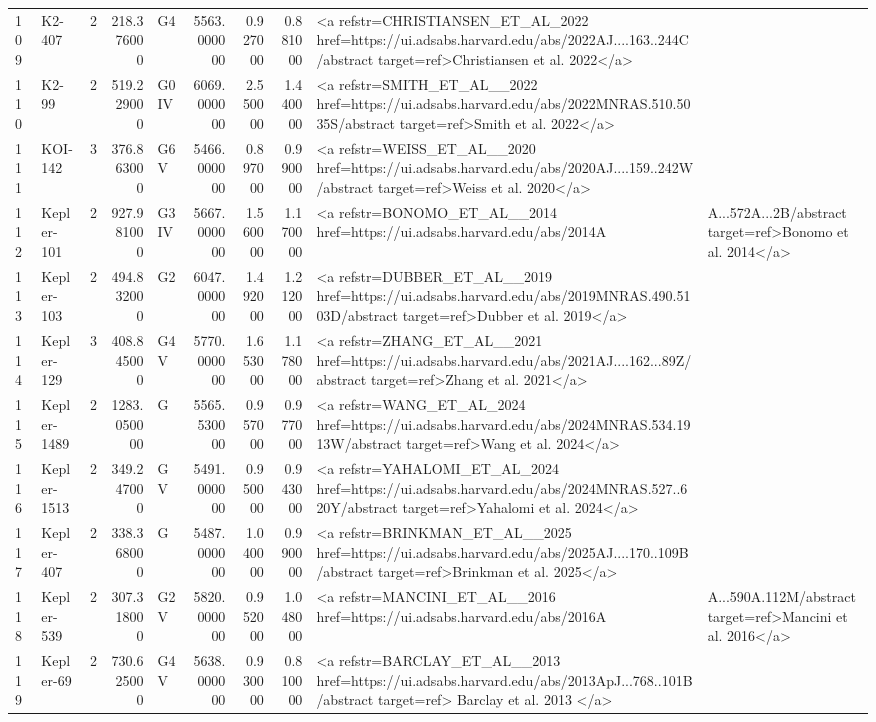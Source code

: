 \begin{tabular}{llrrlrrrl}
109 & K2-407 & 2 & 218.376000 & G4 & 5563.000000 & 0.927000 & 0.881000 & <a refstr=CHRISTIANSEN_ET_AL_2022 href=https://ui.adsabs.harvard.edu/abs/2022AJ....163..244C/abstract target=ref>Christiansen et al. 2022</a> \\
110 & K2-99 & 2 & 519.229000 & G0 IV & 6069.000000 & 2.550000 & 1.440000 & <a refstr=SMITH_ET_AL__2022 href=https://ui.adsabs.harvard.edu/abs/2022MNRAS.510.5035S/abstract target=ref>Smith et al. 2022</a> \\
111 & KOI-142 & 3 & 376.863000 & G6 V & 5466.000000 & 0.897000 & 0.990000 & <a refstr=WEISS_ET_AL__2020 href=https://ui.adsabs.harvard.edu/abs/2020AJ....159..242W/abstract target=ref>Weiss et al. 2020</a> \\
112 & Kepler-101 & 2 & 927.981000 & G3 IV & 5667.000000 & 1.560000 & 1.170000 & <a refstr=BONOMO_ET_AL__2014 href=https://ui.adsabs.harvard.edu/abs/2014A&A...572A...2B/abstract target=ref>Bonomo et al. 2014</a> \\
113 & Kepler-103 & 2 & 494.832000 & G2 & 6047.000000 & 1.492000 & 1.212000 & <a refstr=DUBBER_ET_AL__2019 href=https://ui.adsabs.harvard.edu/abs/2019MNRAS.490.5103D/abstract target=ref>Dubber et al. 2019</a> \\
114 & Kepler-129 & 3 & 408.845000 & G4 V & 5770.000000 & 1.653000 & 1.178000 & <a refstr=ZHANG_ET_AL__2021 href=https://ui.adsabs.harvard.edu/abs/2021AJ....162...89Z/abstract target=ref>Zhang et al. 2021</a> \\
115 & Kepler-1489 & 2 & 1283.050000 & G & 5565.530000 & 0.957000 & 0.977000 & <a refstr=WANG_ET_AL_2024 href=https://ui.adsabs.harvard.edu/abs/2024MNRAS.534.1913W/abstract target=ref>Wang et al. 2024</a> \\
116 & Kepler-1513 & 2 & 349.247000 & G V & 5491.000000 & 0.950000 & 0.943000 & <a refstr=YAHALOMI_ET_AL_2024 href=https://ui.adsabs.harvard.edu/abs/2024MNRAS.527..620Y/abstract target=ref>Yahalomi et al. 2024</a> \\
117 & Kepler-407 & 2 & 338.368000 & G & 5487.000000 & 1.040000 & 0.990000 & <a refstr=BRINKMAN_ET_AL__2025 href=https://ui.adsabs.harvard.edu/abs/2025AJ....170..109B/abstract target=ref>Brinkman et al. 2025</a> \\
118 & Kepler-539 & 2 & 307.318000 & G2 V & 5820.000000 & 0.952000 & 1.048000 & <a refstr=MANCINI_ET_AL__2016 href=https://ui.adsabs.harvard.edu/abs/2016A&A...590A.112M/abstract target=ref>Mancini et al. 2016</a> \\
119 & Kepler-69 & 2 & 730.625000 & G4 V & 5638.000000 & 0.930000 & 0.810000 & <a refstr=BARCLAY_ET_AL__2013 href=https://ui.adsabs.harvard.edu/abs/2013ApJ...768..101B/abstract target=ref> Barclay et al. 2013 </a> \\

\end{tabular}
